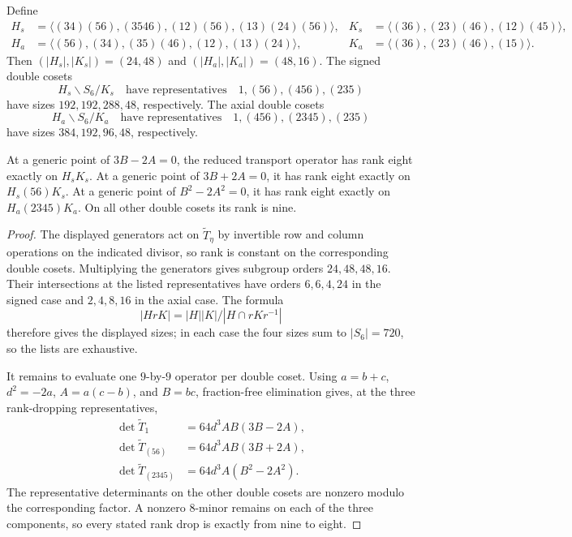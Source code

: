 \begin{lemma}\label{lem:transport-double-cosets}
Define
\[
\begin{aligned}
H_s&=\langle(34)(56),(3546),(12)(56),(13)(24)(56)\rangle,&
K_s&=\langle(36),(23)(46),(12)(45)\rangle,\\
H_a&=\langle(56),(34),(35)(46),(12),(13)(24)\rangle,&
K_a&=\langle(36),(23)(46),(15)\rangle.
\end{aligned}
\]
Then \((|H_s|,|K_s|)=(24,48)\) and
\((|H_a|,|K_a|)=(48,16)\).  The signed double cosets
\[
 H_s\backslash S_6/K_s
 \quad\text{have representatives}\quad
 1,(56),(456),(235)
\]
have sizes \(192,192,288,48\), respectively.  The axial double cosets
\[
 H_a\backslash S_6/K_a
 \quad\text{have representatives}\quad
 1,(456),(2345),(235)
\]
have sizes \(384,192,96,48\), respectively.

At a generic point of \(3B-2A=0\), the reduced transport operator has rank
eight exactly on \(H_sK_s\).  At a generic point of \(3B+2A=0\), it has
rank eight exactly on \(H_s(56)K_s\).  At a generic point of
\(B^2-2A^2=0\), it has rank eight exactly on
\(H_a(2345)K_a\).  On all other double cosets its rank is nine.
\end{lemma}

\begin{proof}
The displayed generators act on \(\widetilde T_\eta\) by invertible row and
column operations on the indicated divisor, so rank is constant on the
corresponding double cosets.  Multiplying the generators gives subgroup
orders \(24,48,48,16\).  Their intersections at the listed representatives
have orders \(6,6,4,24\) in the signed case and \(2,4,8,16\) in the axial
case.  The formula
\[
 |HrK|=|H||K|/|H\cap rKr^{-1}|
\]
therefore gives the displayed sizes; in each case the four sizes sum to
\(|S_6|=720\), so the lists are exhaustive.

It remains to evaluate one \(9\)-by-\(9\) operator per double coset.  Using
\(a=b+c\), \(d^2=-2a\), \(A=a(c-b)\), and \(B=bc\), fraction-free
elimination gives, at the three rank-dropping representatives,
\[
\begin{aligned}
\det\widetilde T_1&=64d^3AB(3B-2A),\\
\det\widetilde T_{(56)}&=64d^3AB(3B+2A),\\
\det\widetilde T_{(2345)}&=64d^3A(B^2-2A^2).
\end{aligned}
\]
The representative determinants on the other double cosets are nonzero
modulo the corresponding factor.  A nonzero \(8\)-minor remains on each of
the three components, so every stated rank drop is exactly from nine to
eight.
\end{proof}

